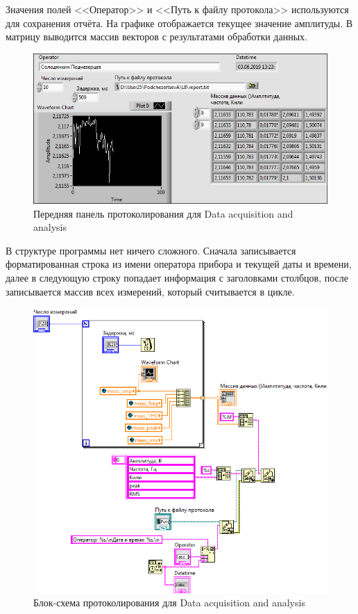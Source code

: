 \documentclass[a4paper,14pt]{article}
\begin{document}
Значения полей <<Оператор>> и <<Путь к файлу протокола>> используются для сохранения отчёта.
На графике отображается текущее значение амплитуды. 
В матрицу выводится массив векторов с результатами обработки данных.

\begin{figure}[H]
	\centering
	\includegraphics[width=\linewidth]{image/daa_scaner_vi}
	\caption{Передняя панель протоколирования для Data acquisition and analysis}\label{img:daa_scaner_vi}
\end{figure}

В структуре программы нет ничего сложного.
Сначала записывается форматированная строка из имени оператора прибора и текущей даты и времени, 
далее в следующую строку попадает информация с заголовками столбцов, 
после записывается массив всех измерений, который считывается в цикле.

\begin{figure}[H]
	\centering
	\includegraphics[width=\linewidth]{image/daa_scaner_schema}
	\caption{Блок-схема протоколирования для Data acquisition and analysis}\label{img:daa_scaner_schema}
\end{figure}
\end{document}
